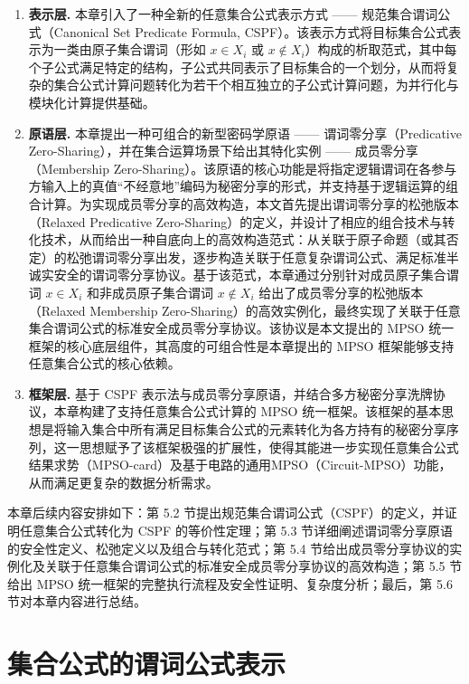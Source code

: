 \begin{enumerate}
    \item \textbf{表示层.} 本章引入了一种全新的任意集合公式表示方式 —— 规范集合谓词公式（Canonical Set Predicate Formula, CSPF）。该表示方式将目标集合公式表示为一类由原子集合谓词（形如 $x \in X_i$ 或 $x \notin X_i$）构成的析取范式，其中每个子公式满足特定的结构，子公式共同表示了目标集合的一个划分，从而将复杂的集合公式计算问题转化为若干个相互独立的子公式计算问题，为并行化与模块化计算提供基础。
    \item \textbf{原语层.} 本章提出一种可组合的新型密码学原语 —— 谓词零分享（Predicative Zero-Sharing），并在集合运算场景下给出其特化实例 —— 成员零分享（Membership Zero-Sharing）。该原语的核心功能是将指定逻辑谓词在各参与方输入上的真值“不经意地”编码为秘密分享的形式，并支持基于逻辑运算的组合计算。为实现成员零分享的高效构造，本文首先提出谓词零分享的松弛版本（Relaxed Predicative Zero-Sharing）的定义，并设计了相应的组合技术与转化技术，从而给出一种自底向上的高效构造范式：从关联于原子命题（或其否定）的松弛谓词零分享出发，逐步构造关联于任意复杂谓词公式、满足标准半诚实安全的谓词零分享协议。基于该范式，本章通过分别针对成员原子集合谓词 $x \in X_i$ 和非成员原子集合谓词 $x \notin X_i$ 给出了成员零分享的松弛版本（Relaxed Membership Zero-Sharing）的高效实例化，最终实现了关联于任意集合谓词公式的标准安全成员零分享协议。该协议是本文提出的 MPSO 统一框架的核心底层组件，其高度的可组合性是本章提出的 MPSO 框架能够支持任意集合公式的核心依赖。
    \item \textbf{框架层.} 基于 CSPF 表示法与成员零分享原语，并结合多方秘密分享洗牌协议，本章构建了支持任意集合公式计算的 MPSO 统一框架。该框架的基本思想是将输入集合中所有满足目标集合公式的元素转化为各方持有的秘密分享序列，这一思想赋予了该框架极强的扩展性，使得其能进一步实现任意集合公式结果求势（MPSO-card）及基于电路的通用MPSO（Circuit-MPSO）功能，从而满足更复杂的数据分析需求。
\end{enumerate}

本章后续内容安排如下：第 5.2 节提出规范集合谓词公式（CSPF）的定义，并证明任意集合公式转化为 CSPF 的等价性定理；第 5.3 节详细阐述谓词零分享原语的安全性定义、松弛定义以及组合与转化范式；第 5.4 节给出成员零分享协议的实例化及关联于任意集合谓词公式的标准安全成员零分享协议的高效构造；第 5.5 节给出 MPSO 统一框架的完整执行流程及安全性证明、复杂度分析；最后，第 5.6 节对本章内容进行总结。

\section{集合公式的谓词公式表示}~\label{sec:predicate_formula}

